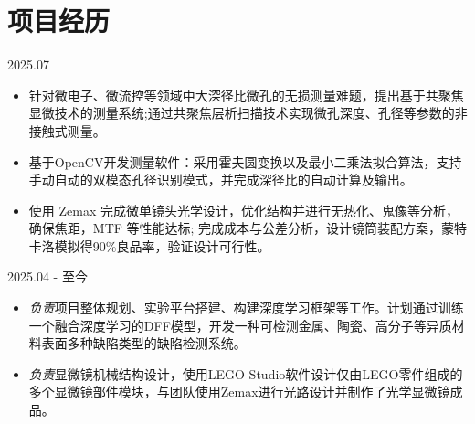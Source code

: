 \documentclass{resume}
\begin{document}
\section{项目经历}

 {2025.07}
\begin{itemize}[parsep=0.5ex]
\item 针对微电子、微流控等领域中大深径比微孔的无损测量难题，提出基于共聚焦显微技术的测量系统;通过共聚焦层析扫描技术实现微孔深度、孔径等参数的非接触式测量。
\item 基于OpenCV开发测量软件：采用霍夫圆变换以及最小二乘法拟合算法，支持手动自动的双模态孔径识别模式，并完成深径比的自动计算及输出。
\end{itemize}

\begin{itemize}[parsep=0.5ex]
\item 使用 Zemax 完成微单镜头光学设计，优化结构并进行无热化、鬼像等分析，确保焦距，MTF 等性能达标; 完成成本与公差分析，设计镜筒装配方案，蒙特卡洛模拟得90\%良品率，验证设计可行性。
\end{itemize}

 {2025.04 - 至今}
\begin{itemize}[parsep=0.5ex]
  \item \textit{负责}项目整体规划、实验平台搭建、构建深度学习框架等工作。计划通过训练一个融合深度学习的DFF模型，开发一种可检测金属、陶瓷、高分子等异质材料表面多种缺陷类型的缺陷检测系统。
\end{itemize}

\begin{itemize}[parsep=0.5ex]
  \item \textit{负责}显微镜机械结构设计，使用LEGO Studio软件设计仅由LEGO零件组成的多个显微镜部件模块，与团队使用Zemax进行光路设计并制作了光学显微镜成品。
\end{itemize}
\end{document}
